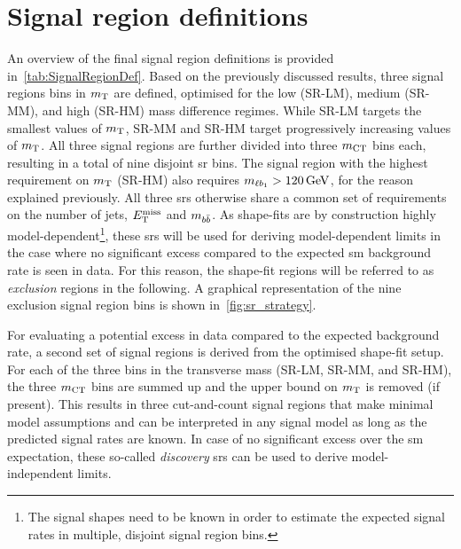 \section{Signal region definitions}\label{sec:signal_region_definitions}

An overview of the final signal region definitions is provided in~\cref{tab:SignalRegionDef}. Based on the previously discussed results, three signal regions bins in $m_{\textrm{T}}$ are defined, optimised for the low (SR-LM), medium (SR-MM), and high (SR-HM) mass difference regimes. While SR-LM targets the smallest values of $m_{\textrm{T}}$, SR-MM and SR-HM target progressively increasing values of $m_{\textrm{T}}$. All three signal regions are further divided into three $m_{\textrm{CT}}$ bins each, resulting in a total of nine disjoint \gls{sr} bins. The signal region with the highest requirement on $m_{\textrm{T}}$ (SR-HM) also requires $\mlb>\SI{120}{\GeV}$, for the reason explained previously. All three \glspl{sr} otherwise share a common set of requirements on the number of jets, $E_{\textrm{T}}^{\textrm{miss}}$ and $m_{b\bar{b}}$. As shape-fits are by construction highly model-dependent\footnote{The signal shapes need to be known in order to estimate the expected signal rates in multiple, disjoint signal region bins.}, these \glspl{sr} will be used for deriving model-dependent limits in the case where no significant excess compared to the expected \gls{sm} background rate is seen in data. For this reason, the shape-fit regions will be referred to as \textit{exclusion} regions in the following. A graphical representation of the nine exclusion signal region bins is shown in~\cref{fig:sr_strategy}.

For evaluating a potential excess in data compared to the expected background rate, a second set of signal regions is derived from the optimised shape-fit setup. For each of the three bins in the transverse mass (SR-LM, SR-MM, and SR-HM), the three $m_{\textrm{CT}}$ bins are summed up and the upper bound on $m_{\textrm{T}}$ is removed (if present). This results in three cut-and-count signal regions that make minimal model assumptions and can be interpreted in any signal model as long as the predicted signal rates are known. In case of no significant excess over the \gls{sm} expectation, these so-called \textit{discovery} \glspl{sr} can be used to derive model-independent limits. 

